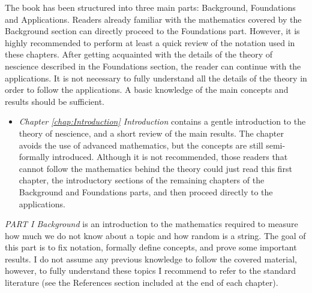 The book has been structured into three main parts: Background, Foundations and Applications. Readers already familiar with the mathematics covered by the Background section can directly proceed to the Foundations part. However, it is highly recommended to perform at least a quick review of the notation used in these chapters. After getting acquainted with the details of the theory of nescience described in the Foundations section, the reader can continue with the applications. It is not necessary to fully understand all the details of the theory in order to follow the applications. A basic knowledge of the main concepts and results should be sufficient.

\bigskip

\begin{itemize}

\item \emph{Chapter \ref{chap:Introduction} Introduction} contains a gentle introduction to the theory of nescience, and a short review of the main results. The chapter avoids the use of advanced mathematics, but the concepts are still semi-formally introduced. Although it is not recommended, those readers that cannot follow the mathematics behind the theory could just read this first chapter, the introductory sections of the remaining chapters of the Background and Foundations parts, and then proceed directly to the applications.

\end{itemize}

\bigskip

\emph{PART I Background} is an introduction to the mathematics required to measure how much we do not know about a topic and how random is a string. The goal of this part is to fix notation, formally define concepts, and prove some important results. I do not assume any previous knowledge to follow the covered material, however, to fully understand these topics I recommend to refer to the standard literature (see the References section included at the end of each chapter).

